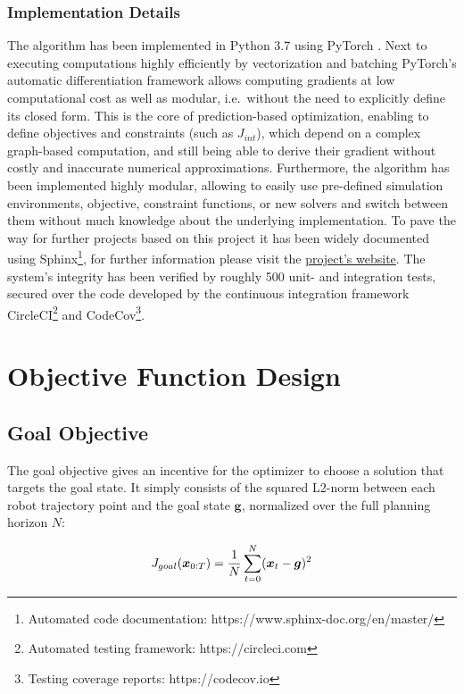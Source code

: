 \subsubsection{Implementation Details} 
The algorithm has been implemented in Python 3.7 using PyTorch \cite{pytorch}. Next to executing computations highly efficiently by vectorization and batching PyTorch's automatic differentiation framework allows computing gradients at low computational cost as well as modular, i.e.\ without the need to explicitly define its closed form. This is the core of prediction-based optimization, enabling to define objectives and constraints (such as $J_{int}$), which depend on a complex graph-based computation, and still being able to derive their gradient without costly and inaccurate numerical approximations. 
\newline 
Furthermore, the algorithm has been implemented highly modular, allowing to easily use pre-defined simulation environments, objective, constraint functions, or new solvers and switch between them without much knowledge about the underlying implementation. To pave the way for further projects based on this project it has been widely documented using Sphinx\footnote{Automated code documentation: https://www.sphinx-doc.org/en/master/}, for further information please visit the \href{https://simon-schaefer.github.io/mantrap/}{project's website}.  
\newline
The system's integrity has been verified by roughly 500 unit- and integration tests, secured over the code developed by the continuous integration framework CircleCI\footnote{Automated testing framework: https://circleci.com} and CodeCov\footnote{Testing coverage reports: https://codecov.io}.

\section{Objective Function Design}
\label{text:approach/objective}

\subsection{Goal Objective}
\label{text:approach/objective/goal}
The goal objective gives an incentive for the optimizer to choose a solution that targets the goal state. It simply consists of the squared L2-norm between each robot trajectory point and the goal state $\boldsymbol{g}$, normalized over the full planning horizon $N$:

\begin{equation}
J_{goal}(\boldsymbol{x}_{0:T}) = \frac{1}{N} \sum_{t = 0}^N (\boldsymbol{x}_t - \boldsymbol{g})^2
\label{eq:goal_unweighted}
\end{equation}

